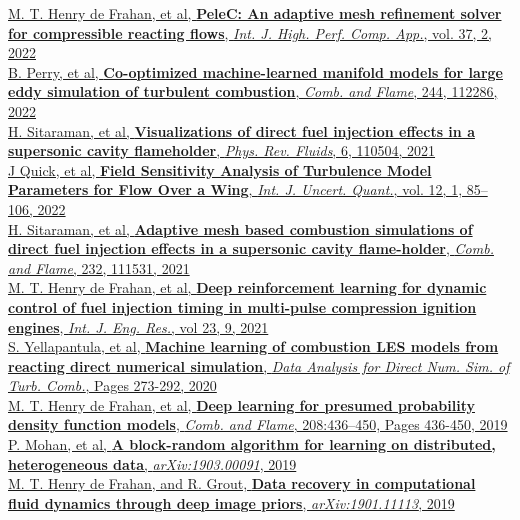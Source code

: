 \documentclass[11pt,letterpaper]{article}
\begin{document}
\href{https://doi.org/10.1177/10943420221121151}{M. T. Henry de Frahan, et al, \textbf{PeleC: An adaptive mesh refinement solver for compressible reacting flows}, \textit{Int. J. High. Perf. Comp. App.}, vol. 37, 2, 2022}\\[0.5ex]
\href{https://doi.org/10.1016/j.combustflame.2022.112286}{B. Perry, et al, \textbf{Co-optimized machine-learned manifold models for large eddy simulation of turbulent combustion}, \textit{Comb. and Flame}, 244, 112286, 2022}\\[0.5ex]
\href{https://doi.org/10.1103/PhysRevFluids.6.110504}{H. Sitaraman, et al, \textbf{Visualizations of direct fuel injection effects in a supersonic cavity flameholder}, \textit{Phys. Rev. Fluids}, 6, 110504, 2021}\\[0.5ex]
\href{https://doi.org/10.1615/Int.J.UncertaintyQuantification.2021036467 }{J Quick, et al, \textbf{Field Sensitivity Analysis of Turbulence Model Parameters for Flow Over a Wing}, \textit{Int. J. Uncert. Quant.}, vol. 12, 1, 85--106, 2022}\\[0.5ex]
\href{https://doi.org/10.1016/j.combustflame.2021.111531}{H. Sitaraman, et al, \textbf{Adaptive mesh based combustion simulations of direct fuel injection effects in a supersonic cavity flame-holder}, \textit{Comb. and Flame}, 232, 111531, 2021}\\[0.5ex]
\href{https://doi.org/10.1177/14680874211019345}{M. T. Henry de Frahan, et al, \textbf{Deep reinforcement learning for dynamic control of fuel injection timing in multi-pulse compression ignition engines}, \textit{Int. J. Eng. Res.}, vol 23, 9, 2021}\\[0.5ex]
\href{https://link.springer.com/chapter/10.1007/978-3-030-44718-2_14}{S. Yellapantula, et al, \textbf{Machine learning of combustion LES models from reacting direct numerical simulation}, \textit{Data Analysis for Direct Num. Sim. of Turb. Comb.}, Pages 273-292, 2020}\\[0.5ex]
\href{https://doi.org/10.1016/j.combustflame.2019.07.015}{M. T. Henry de Frahan, et al, \textbf{Deep learning for presumed probability density function models}, \textit{Comb. and Flame}, 208:436--450, Pages 436-450, 2019}\\[0.5ex]%
\href{http://arxiv.org/abs/1903.00091}{P. Mohan, et al, \textbf{A block-random algorithm for learning on distributed, heterogeneous data}, \textit{arXiv:1903.00091}, 2019}\\[0.5ex]%
\href{http://arxiv.org/abs/1901.11113}{M. T. Henry de Frahan, and R. Grout, \textbf{Data recovery in computational fluid dynamics through deep image priors}, \textit{arXiv:1901.11113}, 2019}\\[0.5ex]%
\end{document}
